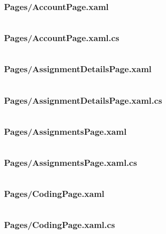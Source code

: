 \documentclass[a4paper]{report}
\begin{document}
\subsubsection{Pages/AccountPage.xaml}

\inputminted{xml}{"../src/Algorithm Dynamics/Pages/AccountPage.xaml"}

\subsubsection{Pages/AccountPage.xaml.cs}

\inputminted{csharp}{"../src/Algorithm Dynamics/Pages/AccountPage.xaml.cs"}

\subsubsection{Pages/AssignmentDetailsPage.xaml}

\inputminted{xml}{"../src/Algorithm Dynamics/Pages/AssignmentDetailsPage.xaml"}

\subsubsection{Pages/AssignmentDetailsPage.xaml.cs}

\inputminted{csharp}{"../src/Algorithm Dynamics/Pages/AssignmentDetailsPage.xaml.cs"}

\subsubsection{Pages/AssignmentsPage.xaml}

\inputminted{xml}{"../src/Algorithm Dynamics/Pages/AssignmentsPage.xaml"}

\subsubsection{Pages/AssignmentsPage.xaml.cs}

\inputminted{csharp}{"../src/Algorithm Dynamics/Pages/AssignmentsPage.xaml.cs"}

\subsubsection{Pages/CodingPage.xaml}

\inputminted{xml}{"../src/Algorithm Dynamics/Pages/CodingPage.xaml"}

\subsubsection{Pages/CodingPage.xaml.cs}
\end{document}
